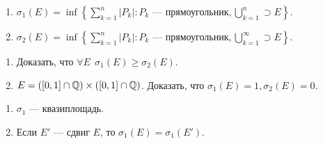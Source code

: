 \begin{example}
    \slashn
     \begin{enumerate}
         \item $\sigma_1(E) = \inf \left\{\sum\limits_{k=1}^n |P_k|\!: P_k\text{ --- прямоугольник}, \bigcup\limits_{k=1}^n \supset E\right\}$.
         \item $\sigma_2(E) = \inf \left\{\sum\limits_{k=1}^n |P_k|\!: P_k\text{ --- прямоугольник}, \bigcup\limits_{k=1}^\infty \supset E\right\}$.
    \end{enumerate}
\end{example}
\begin{exerc}
    \slashn
    \begin{enumerate}
        \item Доказать, что $\forall E\ \ \sigma_1(E) \ge \sigma_2(E)$.
        \item $E = \left([0, 1] \cap \mathbb{Q}\right) \times \left([0, 1] \cap \mathbb{Q}\right)$. Доказать, что  $\sigma_1(E) = 1, \sigma_2(E) = 0$.
    \end{enumerate}
\end{exerc}
\begin{theorem}
    \slashn
     \begin{enumerate}
         \item $\sigma_1$ --- квазиплощадь.
         \item Если  $E'$ --- сдвиг  $E$, то  $\sigma_1(E) = \sigma_1(E')$.
     \end{enumerate}
\end{theorem}
